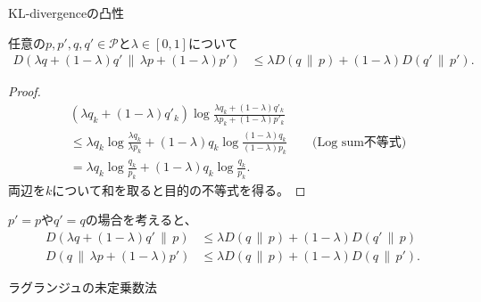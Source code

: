 \documentclass[lualatex,handout]{beamer}
\newcommand{\mycolor}[2]{%
  \begingroup
  \colorlet{currentcolor}{.}%
  \color{#1}#2%
  \color{currentcolor}%
  \endgroup
}
\newcommand{\emm}[1]{\mycolor{red}{#1}}
\newcommand\KL[2]{D\left(#1\,\|\,#2\right)}
\theoremstyle{definition}
\begin{document}
\begin{frame}{KL-divergenceの凸性}
\small
\begin{lemma}
任意の$p,p',q,q'\in\mathcal{P}$と$\lambda\in[0,1]$について
\begin{align*}
\KL{\lambda q+(1-\lambda)q'}{\lambda p+(1-\lambda)p'}
&\le
\lambda\KL{q}{p} + (1-\lambda)\KL{q'}{p'}.
\end{align*}
\end{lemma}
\begin{proof}
\vspace{-2em}
\begin{align*}
&(\lambda q_k+(1-\lambda)q'_k)\log \frac{\lambda q_k+(1-\lambda)q'_k}{\lambda p_k+(1-\lambda)p'_k}\\
&\le \lambda q_k\log \frac{\lambda q_k}{\lambda p_k}
+ (1-\lambda) q_k\log \frac{(1-\lambda) q_k}{(1-\lambda) p_k}\qquad\text{(Log sum不等式)}\\
&= \lambda q_k\log \frac{q_k}{p_k}
+ (1-\lambda) q_k\log \frac{q_k}{p_k}.
\end{align*}
両辺を$k$について和を取ると目的の不等式を得る。
\end{proof}
$p'=p$や$q'=q$の場合を考えると、
\begin{align*}
\KL{\lambda q+(1-\lambda)q'}{p} &\le \lambda\KL{q}{p} + (1-\lambda)\KL{q'}{p}\\
\KL{q}{\lambda p+(1-\lambda)p'} &\le \lambda\KL{q}{p} + (1-\lambda)\KL{q}{p'}.
\end{align*}
\end{frame}

\begin{frame}{ラグランジュの未定乗数法}
\end{frame}
\end{document}
